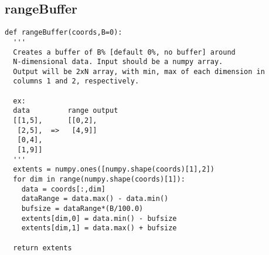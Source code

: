 \documentclass[12pt,letter]{article}
\begin{document}
\subsection{rangeBuffer}
\begin{verbatim}
def rangeBuffer(coords,B=0):
  '''
  Creates a buffer of B% [default 0%, no buffer] around 
  N-dimensional data. Input should be a numpy array.
  Output will be 2xN array, with min, max of each dimension in
  columns 1 and 2, respectively.
  
  ex: 
  data         range output
  [[1,5],      [[0,2],
   [2,5],  =>   [4,9]]
   [0,4],
   [1,9]]
  '''
  extents = numpy.ones([numpy.shape(coords)[1],2])
  for dim in range(numpy.shape(coords)[1]):
    data = coords[:,dim]
    dataRange = data.max() - data.min()
    bufsize = dataRange*(B/100.0)
    extents[dim,0] = data.min() - bufsize
    extents[dim,1] = data.max() + bufsize
    
  return extents
\end{verbatim}
\end{document}
